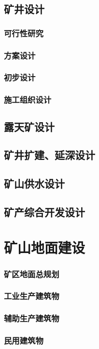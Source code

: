 \documentclass[UTF8]{../../ApplicationUniverse}
\begin{document}
    \subsection{矿井设计}
        \subsubsection{可行性研究}
        \subsubsection{方案设计}
        \subsubsection{初步设计}
        \subsubsection{施工组织设计}
    \subsection{露天矿设计}
    \subsection{矿井扩建、延深设计}
    \subsection{矿山供水设计}
    \subsection{矿产综合开发设计}
\section{矿山地面建设}
    \subsubsection{矿区地面总规划}
    \subsubsection{工业生产建筑物}
    \subsubsection{辅助生产建筑物}
    \subsubsection{民用建筑物}
\end{document}
